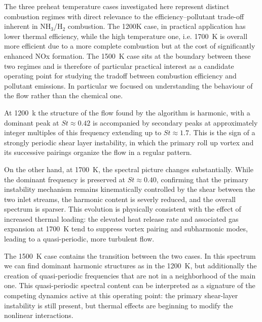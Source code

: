 The three preheat temperature cases investigated here represent distinct combustion regimes with direct relevance to the efficiency--pollutant trade-off inherent in NH$_3$/H$_2$ combustion. The 1200K case, in practical application has lower thermal efficiency, while the high temperature one, i.e. 1700~K is overall more efficient due to a more complete combustion but at the cost of significantly enhanced NOx formation. The 1500~K case sits at the boundary between these two regimes and is therefore of particular practical interest as a candidate operating point for studying the tradoff between combustion efficiency and pollutant emissions. In particular we focused on understanding the behaviour of the flow rather than the chemical one.

At 1200~k the structure of the flow found by the algorithm is harmonic, with a dominant peak at $St \approx 0.42$ is accompanied by secondary peaks at approximately integer multiples of this frequency extending up to $St \approx 1.7$. This is the sign of a strongly periodic shear layer instability, in which the primary roll up vortex and its successive pairings organize the flow in a regular pattern.

On the other hand, at 1700~K, the spectral picture changes substantially. While the dominant frequency is preserved at $St \approx 0.40$, confirming that the primary instability mechanism remains kinematically controlled by the shear between the two inlet streams, the harmonic content is severly reduced, and the overall spectrum is sparser. This evolution is physically consistent with the effect of increased thermal loading: the elevated heat release rate and associated gas expansion at 1700~K tend to suppress vortex pairing and subharmonic modes, leading to a quasi-periodic, more turbulent flow. 

The 1500~K case contains the transition between the two cases. In this spectrum we can find dominant harmonic structures as in the 1200~K, but additionally the creation of quasi-periodic frequencies that are not in a neighborhood of the main one. This quasi-periodic spectral content can be interpreted as a signature of the competing dynamics active at this operating point: the primary shear-layer instability is still present, but thermal effects are beginning to modify the nonlinear interactions.

